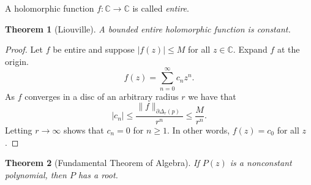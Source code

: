 \documentclass[12pt,openany]{book}
\newcommand{\sabs}[1]{\lvert {#1} \rvert}
\newcommand{\snorm}[1]{\lVert {#1} \rVert}
\newcommand{\C}{{\mathbb{C}}}
\theoremstyle{plain}
\newtheorem{thm}{Theorem}[section]
\theoremstyle{remark}
\theoremstyle{definition}
\theoremstyle{exercise}
\theoremstyle{example}
\begin{document}
A holomorphic function $f \colon \C \to \C$ is called
\emph{entire}.

\begin{thm}[Liouville] \label{thm:Liouville}
A bounded entire holomorphic function is constant.
\end{thm}

\begin{proof}
Let $f$ be entire and suppose $\sabs{f(z)} \leq M$ for all $z \in \C$.
Expand $f$ at the origin.
\begin{equation*}
f(z) = \sum_{n=0}^\infty c_n z^n .
\end{equation*}
As $f$ converges in a disc of an arbitrary radius $r$ we have that
\begin{equation*}
\sabs{c_n} \leq \frac{\snorm{f}_{\partial \Delta_r(p)}}{r^n} \leq
\frac{M}{r^n} .
\end{equation*}
Letting $r \to \infty$ shows that $c_n = 0$ for $n \geq 1$.  In other
words, $f(z) = c_0$ for all $z$.
\end{proof}

\begin{thm}[Fundamental Theorem of Algebra]
If $P(z)$ is a nonconstant polynomial, then $P$ has a root.
\end{thm}
\end{document}
